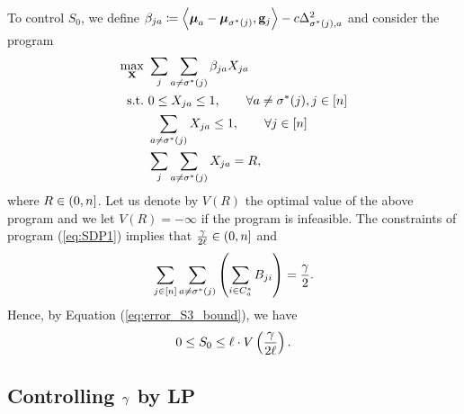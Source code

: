 To control $S_{0}$, we define $\beta_{ja}\coloneqq\left\langle \boldsymbol{\mu}_{a}-\boldsymbol{\mu}_{\sigma^{*}(j)},\mathbf{g}_{j}\right\rangle -c\Delta_{\sigma^{*}(j),a}^{2}$
and consider the program 
\begin{align}
\max_{\mathbf{X}}\  & \sum_{j}\sum_{a\ne\sigma^{*}(j)}\beta_{ja}X_{ja}\nonumber \\
\text{s.t.}\  & 0\leq X_{ja}\leq1,\qquad\forall a\ne\sigma^{*}(j),j\in\left[n\right]\nonumber \\
 & \sum_{a\ne\sigma^{*}(j)}X_{ja}\leq1,\qquad\forall j\in\left[n\right]\label{eq: int_opt}\\
 & \sum_{j}\sum_{a\ne\sigma^{*}(j)}X_{ja}=R,\nonumber 
\end{align}
where $R\in(0,n]$. Let us denote by $V(R)$ the optimal value
of the above program and we let $V(R)=-\infty$ if the program is
infeasible. The constraints of program (\ref{eq:SDP1}) implies that
$\frac{\gamma}{2\ell}\in(0,n]$ and 
\[
\sum_{j\in\left[n\right]}\sum_{a\ne\sigma^{*}(j)}\left(\sum_{i\in C_{a}^{*}}B_{ji}\right)=\frac{\gamma}{2}.
\]
Hence, by Equation (\ref{eq:error_S3_bound}), we have 
\begin{equation}
0\leq S_{0}\leq\ell\cdot V\left(\frac{\gamma}{2\ell}\right).\label{eq:basic_ineq_upper_bound_V}
\end{equation}


\subsection{Controlling $\protect\gamma$ by LP}

